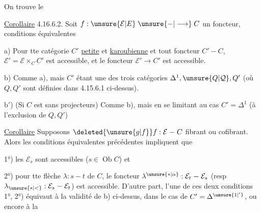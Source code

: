 On trouve   le

\uline{Corollaire} 4.16.6.2. Soit $f:\unsure{\mathcal E|E}\mathrel{\unsure{-|\longrightarrow}}C$ un
foncteur, conditions équivalentes

a) Pour tte  catégorie $C'$ \uline{petite} et
\uline{karoubienne} et tout foncteur $C'\mathrel{-}C$,
$\mathcal E'=\mathcal E\times_C C'$ est accessible, et le foncteur
$\mathcal E'\longrightarrow C'$ est accessible.

b) Comme a), mais $C'$ étant une
des  trois catégories  $\Delta^1,\unsure{Q|\mathcal Q},Q'$
(où $Q,Q'$ sont définies dans 4.15.6.1 ci-dessus).

b$'$) (Si $C$ est sans projecteurs) Comme b),
mais en se limitant au cas $C'=\Delta^1$
(à l'exclusion de $Q,Q'$)

\uline{Corollaire}  Supposons $\deleted{\unsure{g|f}}f:\mathcal E\mathrel{-}C$
fibrant ou cofibrant. Alors les conditions
équivalentes précédentes impliquent que

1°) les $\mathcal E_s$ sont accessibles ($s\in\operatorname{Ob}C$) et

2°) pour tte flèche $\lambda:s\mathrel{-}t$ de $C$,
le foncteur $\lambda^{\unsure{*|\alpha}}:\mathcal E_t\mathrel{-}\mathcal E_s$ (resp $\lambda_{\unsure{*|<}}:\mathcal E_s\mathrel{-}\mathcal E_t$)
est accessible.  D'autre part,
l'une de ces deux conditions 1°, 2°) équivaut
à la validité de b) ci-dessus, dans le
cas de $C'=\Delta^{\unsure{1|'}}$, ou encore à la 
